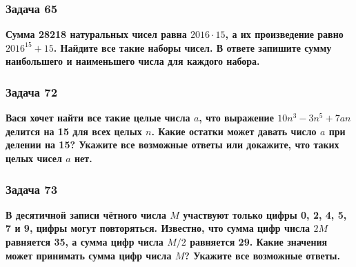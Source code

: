 \documentclass[12pt, a4paper]{article}
\begin{document}
\subsubsection*{Задача 65}
\textbf{Сумма 28218 натуральных чисел равна $2016 \cdot 15$, а их произведение равно $2016^{15} + 15$. Найдите все такие наборы чисел. В ответе запишите сумму наибольшего и наименьшего числа для каждого набора.}

\subsubsection*{Задача 72}
\textbf{Вася хочет найти все такие целые числа $a$, что выражение $10n^3 - 3n^5 + 7an$ делится на 15 для всех целых $n$. Какие остатки может давать число $a$ при делении на 15? Укажите все возможные ответы или докажите, что таких целых чисел $a$ нет.}

\subsubsection*{Задача 73}
\textbf{В десятичной записи чётного числа $M$ участвуют только цифры 0, 2, 4, 5, 7 и 9, цифры могут повторяться. Известно, что сумма цифр числа $2M$ равняется 35, а сумма цифр числа $M/2$ равняется 29. Какие значения может принимать сумма цифр числа $M$? Укажите все возможные ответы.}
\end{document}
